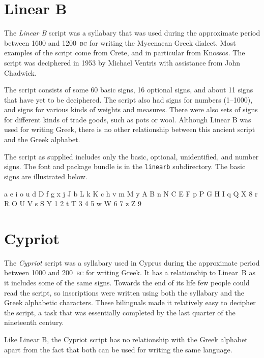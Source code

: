 \documentclass{article}
\newcommand{\BC}{\textsc{bc}}
\begin{document}
\section{Linear B}

    The \textit{Linear B} script was a syllabary that was used during the 
approximate period between 1600 and 1200~\BC{} for writing the Mycenaean Greek
dialect. Most examples of the script come from Crete, and in particular from
Knossos. The script was deciphered in 1953 by Michael Ventris with assistance
from John Chadwick.

    The script consists of some 60 basic signs, 16 optional signs, and about
11 signs that have yet to be deciphered. The script also had signs for numbers
(1--1000), and signs for various kinds of weights and measures. There were
also sets of signs for different kinds of trade goods, such as pots or wool.
Although Linear B was used for writing Greek, there is no other relationship
between this ancient script and the Greek alphabet.

    The script as supplied includes only the basic, optional, unidentified,
and number signs. The font and package bundle is in the \texttt{linearb}
subdirectory. The basic signs are illustrated below.

\begin{center}
\renewcommand{\baselinestretch}{1.2}
\linbfamily
a e i o u 
d D f g x 
j J b L
k K c h v
m M y A B
n N C E F
p P G H I
q Q X 8
r R O U V
s S Y 1 2
t T 3 4 5
w W 6 7
z Z 9
\end{center}

\section{Cypriot}

    The \textit{Cypriot} script was a syllabary used in Cyprus during the
approximate period between 1000 and 200~\BC{} for writing Greek. It has a 
relationship to Linear~B as it includes some of the same signs. Towards
the end of its life few people could read the script, so inscriptions
were written using both the syllabary and the Greek alphabetic characters.
These bilinguals made it relatively easy to decipher the script, a task that
was essentially completed by the last quarter of the nineteenth century.

    Like Linear B, the Cypriot script has no relationship with the Greek
alphabet apart from the fact that both can be used for writing the same
language.
\end{document}

